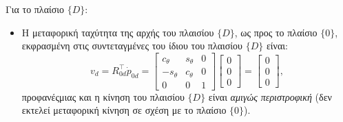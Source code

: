 \documentclass[12pt]{article} %
\numberwithin{equation}{section}  %
\begin{document}
Για το πλαίσιο $\{D\}$:
\begin{itemize}[nolistsep, noitemsep]
    \item Η μεταφορική ταχύτητα της αρχής του πλαισίου $\{D\}$, ως προς το πλαίσιο $\{0\}$, εκφρασμένη στις συντεταγμένες του ίδιου του πλαισίου $\{D\}$ είναι:
    \begin{equation}\label{eq:v0d_D}
        v_d = R_{0d}^{\top} \dot{p}_{0d} = \begin{bmatrix}
        c_\theta  & s_\theta & 0 \\
        -s_\theta & c_\theta & 0 \\
        0 &         0      &  1
    \end{bmatrix} \begin{bmatrix}
        0 \\
        0 \\
        0 
    \end{bmatrix} = \begin{bmatrix}
        0 \\
        0 \\
        0 
    \end{bmatrix},
    \end{equation}
    προφανές\textemdash μιας και η κίνηση του πλαισίου $\{D\}$ είναι \textit{αμιγώς περιστροφική} (δεν εκτελεί μεταφορική κίνηση σε σχέση με το πλαίσιο $\{0\}$).


\end{itemize}
\end{document}
